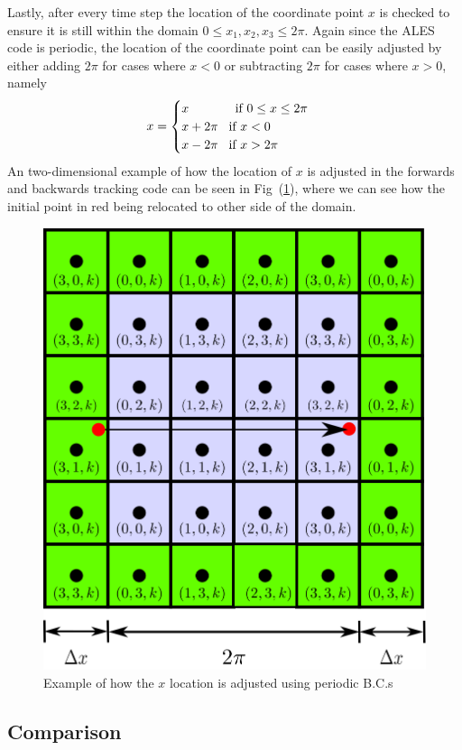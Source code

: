 Lastly, after every time step the location of the coordinate point $x$ is
checked to ensure it is still within the domain $0 \leq x_{1}, x_{2}, x_{3}
\leq 2\pi$. Again since the ALES code is periodic, the location of the
coordinate point can be easily adjusted by either adding $2\pi$ for cases
where $x<0$ or subtracting $2\pi$ for cases where $x>0$, namely
\begin{equation}
    x = 
    \begin{cases}
        x           \text{\hspace{1.3cm}if $ 0 \leq x \leq 2\pi$}  \\
        x + 2\pi    \text{\hspace{0.3cm}if $ x < 0$}  \\
        x - 2\pi    \text{\hspace{0.3cm}if $ x > 2\pi$}     \\
    \end{cases}
\end{equation}
An two-dimensional example of how the location of $x$ is adjusted in the
forwards and backwards tracking code can be seen in
Fig~(\ref{fig:location-adjustment}), where we can see how the initial point
in red being relocated to other side of the domain.
\begin{figure}[H]
    \includegraphics[height=0.35\textheight]{media/rk4/location-adjustment}
    \caption{Example of how the $x$ location is adjusted using periodic B.C.s}
    \label{fig:location-adjustment}
\end{figure}


        

\subsection{Comparison}
